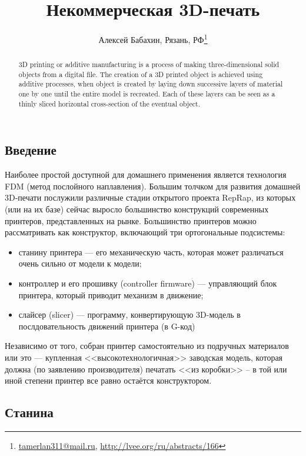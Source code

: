 \documentclass[10pt, a5paper]{article}
\begin{document}
\title{Некоммерческая 3D-печать}
\author{Алексей Бабахин, Рязань, РФ\footnote{\url{tamerlan311@mail.ru}, \url{http://lvee.org/ru/abstracts/166}}}
\maketitle
\begin{abstract}
3D printing or additive manufacturing is a process of making three-dimensional solid objects from a digital file. The creation of a 3D printed object is achieved using additive processes, when object is created by laying down successive layers of material one by one until the entire model is recreated. Each of these layers can be seen as a thinly sliced horizontal cross-section of the eventual object.
\end{abstract}
\subsection*{Введение}

Наиболее простой доступной для домашнего применения является технология FDM (метод послойного наплавления). Большим толчком для развития домашней 3D-печати послужили различные стадии открытого проекта RepRap, из которых (или на их базе) сейчас выросло большинство конструкций современных принтеров, представленных на рынке.
Большинство принтеров можно рассматривать как конструктор, включающий три ортогональные подсистемы:

\begin{itemize}
  \item станину принтера --- его механическую часть, которая может различаться очень сильно от модели к модели;
  \item контроллер и его прошивку (controller firmware) --- управляющий блок принтера, который приводит механизм в движение;
  \item слайсер (slicer) --- программу, конвертирующую 3D-модель в послдовательность движений принтера (в G-код)
\end{itemize}

Независимо от того, собран принтер самостоятельно из подручных материалов или это --- купленная <<высокотехнологичная>> заводская модель, которая должна (по заявлению производителя) печатать <<из коробки>>  -- в той или иной степени принтер все равно остаётся конструктором.

\subsection*{Станина}
\end{document}
